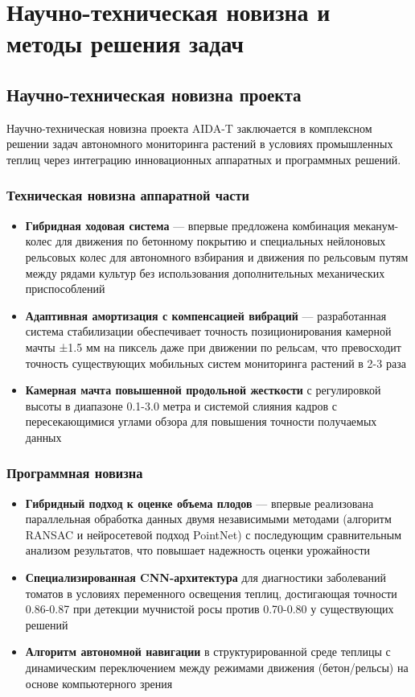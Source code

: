 \documentclass[12pt,a4paper]{article}
\begin{document}
\section{Научно-техническая новизна и методы решения задач}

\subsection{Научно-техническая новизна проекта}

Научно-техническая новизна проекта AIDA-T заключается в комплексном решении задач автономного мониторинга растений в условиях промышленных теплиц через интеграцию инновационных аппаратных и программных решений.

\subsubsection{Техническая новизна аппаратной части}
\begin{itemize}
    \item \textbf{Гибридная ходовая система} — впервые предложена комбинация меканум-колес для движения по бетонному покрытию и специальных нейлоновых рельсовых колес для автономного взбирания и движения по рельсовым путям между рядами культур без использования дополнительных механических приспособлений
    \item \textbf{Адаптивная амортизация с компенсацией вибраций} — разработанная система стабилизации обеспечивает точность позиционирования камерной мачты ±1.5 мм на пиксель даже при движении по рельсам, что превосходит точность существующих мобильных систем мониторинга растений в 2-3 раза
    \item \textbf{Камерная мачта повышенной продольной жесткости} с регулировкой высоты в диапазоне 0.1-3.0 метра и системой слияния кадров с пересекающимися углами обзора для повышения точности получаемых данных
\end{itemize}

\subsubsection{Программная новизна}
\begin{itemize}
    \item \textbf{Гибридный подход к оценке объема плодов} — впервые реализована параллельная обработка данных двумя независимыми методами (алгоритм RANSAC и нейросетевой подход PointNet) с последующим сравнительным анализом результатов, что повышает надежность оценки урожайности
    \item \textbf{Специализированная CNN-архитектура} для диагностики заболеваний томатов в условиях переменного освещения теплиц, достигающая точности 0.86-0.87 при детекции мучнистой росы против 0.70-0.80 у существующих решений
    \item \textbf{Алгоритм автономной навигации} в структурированной среде теплицы с динамическим переключением между режимами движения (бетон/рельсы) на основе компьютерного зрения
\end{itemize}
\end{document}
